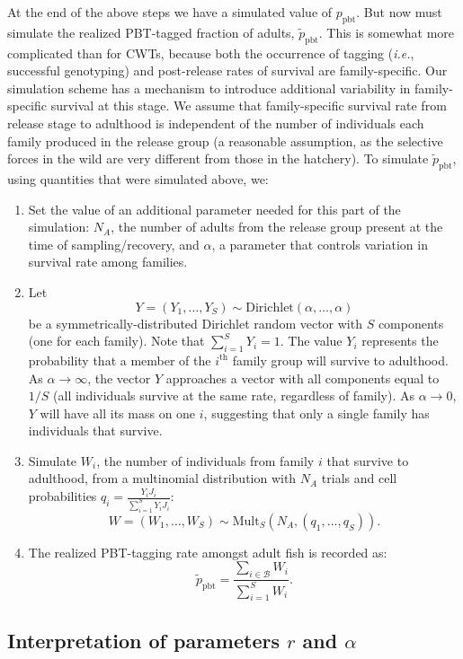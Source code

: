 \documentclass[11pt]{article}
\newcommand{\thh}{^\mathrm{th}}
\newcommand{\ie}{{\em i.e.},\xspace }
\begin{document}
At the end of the above steps we have a simulated value of $p_\mathrm{pbt}$.  But now must simulate
the realized PBT-tagged fraction of adults, $\tilde{p}_\mathrm{pbt}$. 
This is somewhat more complicated than for CWTs, because both the occurrence of tagging (\ie successful genotyping)
and post-release rates of survival
are family-specific.  Our simulation scheme has a mechanism to introduce additional
variability in family-specific survival at this stage.  We assume that family-specific survival rate from release
stage to adulthood is independent of the number of individuals each family produced in the release
group (a reasonable assumption, as the selective forces in the wild are very different from those in the 
hatchery).    To simulate $\tilde{p}_\mathrm{pbt}$, using
quantities that were simulated above, we:
\begin{enumerate}
\item Set the value of an additional parameter needed for this part of the simulation: $N_A$, the number
of adults from the release group present at the time of sampling/recovery, and $\alpha$,
a parameter that controls variation in survival rate among families. 
\item Let 
\[
Y = (Y_1,\ldots, Y_S) \sim \mathrm{Dirichlet}(\alpha, \ldots, \alpha)
\]
be a symmetrically-distributed Dirichlet random vector with $S$ components (one for each family).  Note that
$\sum_{i=1}^S Y_i =1$.  The value $Y_i$ represents the probability that a member of the $i\thh$ family group
will survive to adulthood.  As $\alpha \rightarrow \infty$, the vector $Y$ approaches a vector with
all components equal to $1/S$ (all individuals survive at the same rate, regardless of family).  As $\alpha
\rightarrow 0$, $Y$ will have all its mass on one $i$, suggesting that only a single family has individuals
that survive.
\item Simulate $W_i$, the number of individuals from family $i$
that survive to adulthood, from a multinomial distribution
with $N_A$ trials and cell probabilities $q_i = \frac{Y_i J_i}{\sum_{i=1}^S Y_i J_i}$:
\[
W = (W_1,\ldots, W_S) \sim \mathrm{Mult}_S(N_A, (q_1, \ldots, q_S)).
\]
\item The realized PBT-tagging rate amongst adult fish is recorded as:
\[
\tilde{p}_\mathrm{pbt} = \frac{\sum_{i\in\mathcal{B}} W_i}{\sum_{i=1}^S W_i}.
\]
\end{enumerate}



 
\subsection{Interpretation of parameters $r$ and $\alpha$}
\end{document}
